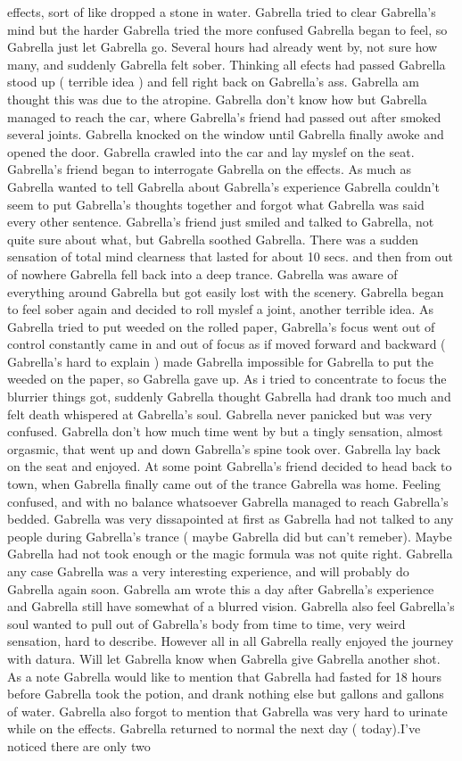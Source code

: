 \documentclass[12pt]{book}
\begin{document}
effects, sort of like dropped a stone in water. Gabrella tried to clear Gabrella's mind but the harder Gabrella tried the more confused Gabrella began to feel, so Gabrella just let Gabrella go. Several hours had already went by, not sure how many, and suddenly Gabrella felt sober. Thinking all efects had passed Gabrella stood up ( terrible idea ) and fell right back on Gabrella's ass. Gabrella am thought this was due to the atropine. Gabrella don't know how but Gabrella managed to reach the car, where Gabrella's friend had passed out after smoked several joints. Gabrella knocked on the window until Gabrella finally awoke and opened the door. Gabrella crawled into the car and lay myslef on the seat. Gabrella's friend began to interrogate Gabrella on the effects. As much as Gabrella wanted to tell Gabrella about Gabrella's experience Gabrella couldn't seem to put Gabrella's thoughts together and forgot what Gabrella was said every other sentence. Gabrella's friend just smiled and talked to Gabrella, not quite sure about what, but Gabrella soothed Gabrella. There was a sudden sensation of total mind clearness that lasted for about 10 secs. and then from out of nowhere Gabrella fell back into a deep trance. Gabrella was aware of everything around Gabrella but got easily lost with the scenery. Gabrella began to feel sober again and decided to roll myslef a joint, another terrible idea. As Gabrella tried to put weeded on the rolled paper, Gabrella's focus went out of control constantly came in and out of focus as if moved forward and backward ( Gabrella's hard to explain ) made Gabrella impossible for Gabrella to put the weeded on the paper, so Gabrella gave up. As i tried to concentrate to focus the blurrier things got, suddenly Gabrella thought Gabrella had drank too much and felt death whispered at Gabrella's soul. Gabrella never panicked but was very confused. Gabrella don't how much time went by but a tingly sensation, almost orgasmic, that went up and down Gabrella's spine took over. Gabrella lay back on the seat and enjoyed. At some point Gabrella's friend decided to head back to town, when Gabrella finally came out of the trance Gabrella was home. Feeling confused, and with no balance whatsoever Gabrella managed to reach Gabrella's bedded. Gabrella was very dissapointed at first as Gabrella had not talked to any people during Gabrella's trance ( maybe Gabrella did but can't remeber). Maybe Gabrella had not took enough or the magic formula was not quite right. Gabrella any case Gabrella was a very interesting experience, and will probably do Gabrella again soon. Gabrella am wrote this a day after Gabrella's experience and Gabrella still have somewhat of a blurred vision. Gabrella also feel Gabrella's soul wanted to pull out of Gabrella's body from time to time, very weird sensation, hard to describe. However all in all Gabrella really enjoyed the journey with datura. Will let Gabrella know when Gabrella give Gabrella another shot. As a note Gabrella would like to mention that Gabrella had fasted for 18 hours before Gabrella took the potion, and drank nothing else but gallons and gallons of water. Gabrella also forgot to mention that Gabrella was very hard to urinate while on the effects. Gabrella returned to normal the next day ( today).I've noticed there are only two 
\end{document}
